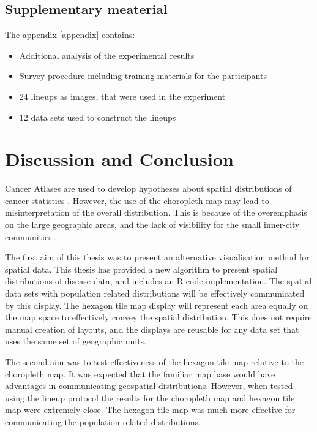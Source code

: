 \documentclass{monashthesis}
\begin{document}
\hypertarget{supplementary-meaterial}{%
\section{Supplementary meaterial}\label{supplementary-meaterial}}

The appendix \ref{appendix} contains:

\begin{itemize}
\tightlist
\item
  Additional analysis of the experimental results
\item
  Survey procedure including training materials for the participants
\item
  24 lineups as images, that were used in the experiment
\item
  12 data sets used to construct the lineups
\end{itemize}

\hypertarget{conclusion}{%
\chapter{Discussion and Conclusion}\label{conclusion}}

Cancer Atlases are used to develop hypotheses about spatial distributions of cancer statistics \autocite{CPISACA}. However, the use of the choropleth map may lead to misinterpretation of the overall distribution. This is because of the overemphasis on the large geographic areas, and the lack of visibility for the small inner-city communities \autocite{ACTUC}.

The first aim of this thesis was to present an alternative visualisation method for spatial data. This thesis has provided a new algorithm to present spatial distributions of disease data, and includes an R code \autocite{R} implementation. The spatial data sets with population related distributions will be effectively communicated by this display. The hexagon tile map display will represent each area equally on the map space to effectively convey the spatial distribution. This does not require manual creation of layouts, and the displays are reusable for any data set that uses the same set of geographic units.

The second aim was to test effectiveness of the hexagon tile map relative to the choropleth map. It was expected that the familiar map base would have advantages in communicating geospatial distributions. However, when tested using the lineup protocol the results for the choropleth map and hexagon tile map were extremely close. The hexagon tile map was much more effective for communicating the population related distributions.
\end{document}
